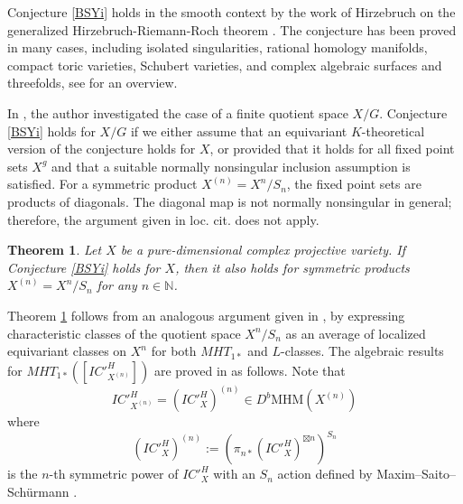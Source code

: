 \documentclass[11pt,leqno,twoside]{amsart}
\theoremstyle{plainsl}
\newtheorem{theorem}{Theorem}[section]
\theoremstyle{definition}
\newcommand{\mhm}{\mathrm{MHM}}
\begin{document}
Conjecture \ref{BSYi} holds in the smooth context by the work of Hirzebruch on the generalized Hirzebruch-Riemann-Roch theorem \cite{H}. The conjecture has been proved in many cases, including isolated singularities, rational homology manifolds, compact toric varieties, Schubert varieties, and complex algebraic surfaces and threefolds, see \cite{AMS} for an overview.


In \cite{A}, the author investigated the case of a finite quotient space $X/G$. Conjecture \ref{BSYi} holds for $X/G$ if we either assume that an equivariant $K$-theoretical version of the conjecture holds for $X$, or provided that it holds for all fixed point sets $X^g$ and that a suitable normally nonsingular inclusion assumption is satisfied. For a symmetric product $X^{(n)}=X^n/S_n$, the fixed point sets are products of diagonals. The diagonal map is not normally nonsingular in general; therefore, the argument given in loc. cit. does not apply. 



\begin{theorem}\label{bsyconjforsymmetric}
     Let $X$ be a pure-dimensional complex projective variety. If Conjecture \ref{BSYi} holds for $X$, then it also holds for symmetric products $X^{(n)}=X^n/S_n$ for any $n\in \mathbb{N}$.
 \end{theorem}








 Theorem \ref{bsyconjforsymmetric} follows from an analogous argument given in \cite{CMSSY,CMSS}, by expressing characteristic classes of the quotient space $X^n/S_n$ as an average of localized equivariant classes on $X^n$ for both $MHT_{1*}$ and $L$-classes. The algebraic results for $MHT_{1*}([IC'^H_{X^{(n)}}])$ are proved in \cite{CMSSY} as follows. Note that 
 \[IC'^H_{X^{(n)}}=(IC'^H_X)^{(n)} \in D^b\mhm(X^{(n)})\]
where $$(IC'^H_X)^{(n)}:=\left(\pi_{n*}(IC'^H_X)^{\boxtimes n}\right)^{S_n}$$ is the $n$-th symmetric power of $IC'^H_{X}$ with an $S_n$ action defined by Maxim--Saito--Sch\"urmann \cite{MSS}.
\end{document}
